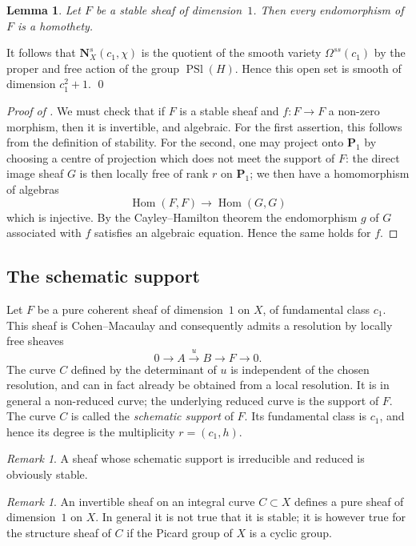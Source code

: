 \documentclass[12pt,english]{smfart}%
\theoremstyle{plain}
\newtheorem{lemma}[theorem]{Lemma}
\theoremstyle{definition}
\theoremstyle{remark}
\newtheorem{remark}[theorem]{Remark}
\newcommand{\PP}{\mathbf{P}}
\DeclareMathOperator{\Hom}{Hom}
\DeclareMathOperator{\PSl}{PSl}
\newcommand{\origpage}[1]{\marginnote{\scriptsize\itshape p.~#1}}
\begin{document}
\begin{lemma}\label{lem:homothety}
Let $F$ be a stable sheaf of dimension~$1$. Then every endomorphism of $F$ is a homothety.
\end{lemma}

It follows that $\mathbf{N}^{s}_{X}(c_{1},\chi)$ is the quotient of the smooth variety $\Omega^{ss}(c_{1})$ by the proper and free action of the group $\PSl(H)$. Hence this open set is smooth of dimension $c_{1}^{2}+1$. \qed

\begin{proof}[Proof of ]
We must check that if $F$ is a stable sheaf and $f:F\to F$ a non-zero morphism, then it is invertible, and algebraic. For the first assertion, this follows from the definition of stability. For the second, one may project onto $\PP_{1}$ by choosing a centre of projection which does not meet the support of $F$: the direct image sheaf $G$ is then locally free of rank $r$ on $\PP_{1}$; we then have a homomorphism of algebras
\[
\Hom(F,F) \longrightarrow \Hom(G,G)
\]
which is injective. By the Cayley--Hamilton theorem the endomorphism $g$ of $G$ associated with $f$ satisfies an algebraic equation. Hence the same holds for $f$.
\end{proof}

\origpage{640}
\subsection{The schematic support}\label{subsec:support}

Let $F$ be a pure coherent sheaf of dimension~$1$ on $X$, of fundamental class $c_{1}$. This sheaf is Cohen--Macaulay and consequently admits a resolution by locally free sheaves
\[
0 \longrightarrow A \stackrel{u}{\longrightarrow} B \longrightarrow F
\longrightarrow 0 .
\]
The curve $C$ defined by the determinant of $u$ is independent of the chosen resolution, and can in fact already be obtained from a local resolution. It is in general a non-reduced curve; the underlying reduced curve is the support of $F$. The curve $C$ is called the \emph{schematic support} of $F$. Its fundamental class is $c_{1}$, and hence its degree is the multiplicity $r=(c_{1},h)$.

\begin{remark}\label{rem:irred-support}
A sheaf whose schematic support is irreducible and reduced is obviously stable.
\end{remark}

\begin{remark}\label{rem:invertible}
An invertible sheaf on an integral curve $C\subset X$ defines a pure sheaf of dimension~$1$ on $X$. In general it is not true that it is stable; it is however true for the structure sheaf of $C$ if the Picard group of $X$ is a cyclic group.
\end{remark}
\end{document}
